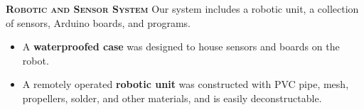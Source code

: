 \documentclass[final,t]{beamer}
\begin{document}
\begin{frame}{}
\begin{columns}
\begin{column}{.34\linewidth}
\begin{alertblock}{\textsc{\textbf{Robotic and Sensor System}}}
                   Our system includes a robotic unit, a collection of sensors, Arduino boards, and  programs.
                    \begin{itemize}
                    	\item A \textbf{waterproofed case} was designed to house sensors and boards on the robot.
						\item A remotely operated \textbf{robotic unit} was constructed with PVC pipe,
                      mesh, propellers, solder, and other materials, and is easily
                      deconstructable.
				 \end{itemize}
				

\end{alertblock}
\end{column}
\end{columns}
\end{frame}
\end{document}
